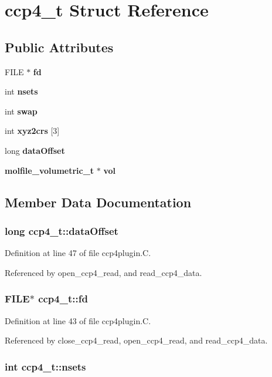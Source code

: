 \section{ccp4\_\-t  Struct Reference}
\label{structccp4__t}
\subsection*{Public Attributes}
\begin{CompactItemize}
\item 
FILE $\ast$ {\bf fd}
\item 
int {\bf nsets}
\item 
int {\bf swap}
\item 
int {\bf xyz2crs} [3]
\item 
long {\bf data\-Offset}
\item 
{\bf molfile\_\-volumetric\_\-t} $\ast$ {\bf vol}
\end{CompactItemize}


\subsection{Member Data Documentation}
\subsubsection{\setlength{\rightskip}{0pt plus 5cm}long ccp4\_\-t::data\-Offset}\label{structccp4__t_m4}




Definition at line 47 of file ccp4plugin.C.

Referenced by open\_\-ccp4\_\-read, and read\_\-ccp4\_\-data.
\subsubsection{\setlength{\rightskip}{0pt plus 5cm}FILE$\ast$ ccp4\_\-t::fd}\label{structccp4__t_m0}




Definition at line 43 of file ccp4plugin.C.

Referenced by close\_\-ccp4\_\-read, open\_\-ccp4\_\-read, and read\_\-ccp4\_\-data.
\subsubsection{\setlength{\rightskip}{0pt plus 5cm}int ccp4\_\-t::nsets}\label{structccp4__t_m1}





